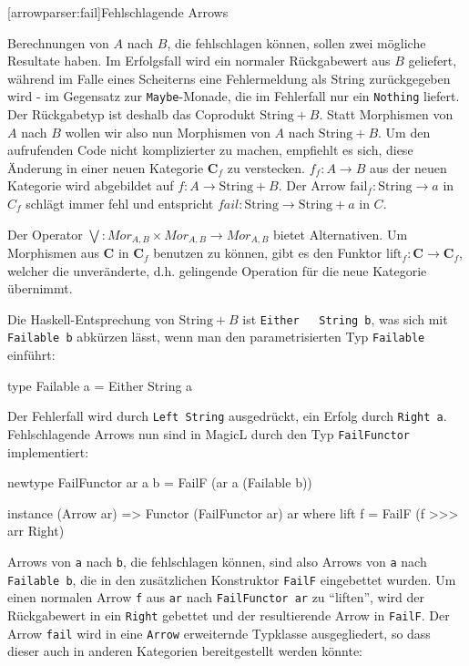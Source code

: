 \documentclass[11pt, a4paper, bibgerm]{scrbook}
\newcommand\icode[1]{\lstinline?#1?}
\newcommand\lsection{}
\newcommand\ato{\rightarrow} %
\begin{document}
\lsection[arrowparser:fail]{Fehlschlagende Arrows}

Berechnungen von $A$ nach $B$, die fehlschlagen können, sollen zwei
mögliche Resultate haben. Im Erfolgsfall wird ein normaler Rückgabewert
aus $B$ geliefert, während im Falle eines Scheiterns eine Fehlermeldung
als String zurückgegeben wird - im Gegensatz zur \icode{Maybe}-Monade,
die im Fehlerfall nur ein \icode{Nothing} liefert. Der Rückgabetyp ist
deshalb das Coprodukt $\mathrm{String}+B$. Statt Morphismen von $A$ nach
$B$ wollen wir also nun Morphismen von $A$ nach $\mathrm{String}+B$. Um
den aufrufenden Code nicht komplizierter zu machen, empfiehlt es sich,
diese Änderung in einer neuen Kategorie $\mathbf{C}_f$ zu
verstecken. $f_{f} : A \rightarrow B$ aus der neuen Kategorie wird
abgebildet auf $f : A \rightarrow \mathrm{String} + B$. Der Arrow
$\mathrm{fail}_{f} : \mathrm{String} \rightarrow a$ in $C_{f}$ schlägt
immer fehl und entspricht $fail : \mathrm{String} \rightarrow
\mathrm{String} + a$ in $C$.

Der Operator $\bigvee : Mor_{A,B} \times Mor_{A,B}
\rightarrow Mor_{A,B} $ bietet Alternativen. Um Morphismen aus
$\mathbf{C}$ in $\mathbf{C}_f$ benutzen zu können, gibt es den Funktor
$\mathrm{lift}_f:\mathbf{C} \ato \mathbf{C}_f$, welcher die
unveränderte, d.h. gelingende Operation für die neue Kategorie
übernimmt.

Die Haskell-Entsprechung von $\mathrm{String}+B$ ist \icode{Either
  String b}, was sich mit \icode{Failable b} abkürzen lässt, wenn man
den parametrisierten Typ \icode{Failable} einführt:

\begin{code}
type Failable a = Either String a
\end{code}

Der Fehlerfall wird durch \icode{Left String} ausgedrückt, ein Erfolg
durch \icode{Right a}. Fehlschlagende Arrows nun sind in MagicL durch den
Typ \icode{FailFunctor} implementiert:

\begin{code}
newtype FailFunctor ar a b = FailF (ar a (Failable b))

instance (Arrow ar) => Functor (FailFunctor ar) ar where
    lift f = FailF (f >>> arr Right)
\end{code} %

Arrows von \icode{a} nach \icode{b}, die fehlschlagen können, sind also
Arrows von \icode{a} nach \icode{Failable b}, die in den zusätzlichen
Konstruktor \icode{FailF} eingebettet wurden. Um einen normalen Arrow
\icode{f} aus \icode{ar} nach \icode{FailFunctor ar} zu "`liften"', wird
der Rückgabewert in ein \icode{Right} gebettet und der resultierende
Arrow in \icode{FailF}.
Der Arrow \icode{fail} wird in eine \icode{Arrow} erweiternde Typklasse
ausgegliedert, so dass dieser auch in anderen Kategorien bereitgestellt
werden könnte:
\end{document}
